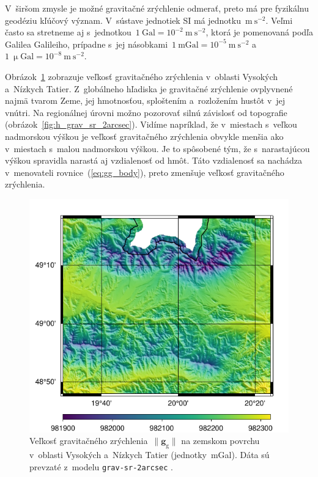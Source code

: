 \documentclass[a4paper, 12pt]{book}
\newcommand{\gidx}{\mathrm g}
\let\vec\mathbf
\begin{document}
V~širšom zmysle je možné gravitačné zrýchlenie odmerať, preto má pre fyzikálnu 
geodéziu kľúčový význam.  V~sústave jednotiek SI má jednotku~$\mathrm{m}\ 
\mathrm{s}^{-2}$.  Veľmi často sa stretneme aj s~jednotkou~$1\ \mathrm{Gal} 
= 10^{-2}\ \mathrm{m}\ \mathrm{s}^{-2}$, ktorá je pomenovaná podľa Galilea 
Galileiho, prípadne s~jej násobkami~$1\ \mathrm{mGal} = 10^{-5}\ \mathrm{m}\ 
\mathrm{s}^{-2}$ a~$1\ \upmu \mathrm{Gal} = 10^{-8}\ \mathrm{m}\ 
\mathrm{s}^{-2}$.

Obrázok~\ref{fig:gg_grav_sr_2arcsec} zobrazuje veľkosť gravitačného zrýchlenia 
v~oblasti Vysokých a~Nízkych Tatier.  Z~globálneho hľadiska je gravitačné 
zrýchlenie ovplyvnené najmä tvarom Zeme, jej hmotnosťou, sploštením 
a~rozložením hustôt v~jej vnútri.  Na regionálnej úrovni možno pozorovať silnú 
závislosť od topografie (obrázok~\ref{fig:h_grav_sr_2arcsec}).  Vidíme 
napríklad, že v~miestach s~veľkou nadmorskou výškou je veľkosť gravitačného 
zrýchlenia obvykle menšia ako v~miestach s~malou nadmorskou výškou.  Je to 
spôsobené tým, že s~narastajúcou výškou spravidla narastá aj vzdialenosť od 
hmôt.  Táto vzdialenosť sa nachádza v~menovateli rovnice~(\ref{eq:gg_body}), 
preto zmenšuje veľkosť gravitačného zrýchlenia.

\begin{figure}
\centering
\includegraphics{./fig-gg-grav-sr-2arcsec.pdf}
\caption{Veľkosť gravitačného zrýchlenia~$\| \vec g_\gidx \|$ na zemskom 
povrchu v~oblasti Vysokých a~Nízkych Tatier (jednotky~mGal).  Dáta sú prevzaté 
z~modelu \texttt{grav-sr-2arcsec} \parencite{GravSR2arcsec}.}
\label{fig:gg_grav_sr_2arcsec}
\end{figure}
\end{document}
